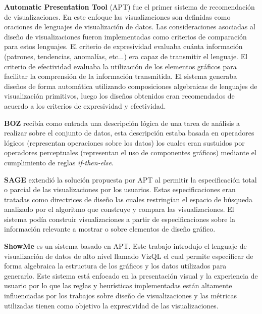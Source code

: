 \textbf{Automatic Presentation Tool} (APT) \cite{mackinlay1986automating} fue el primer sistema de recomendaci\'on de visualizaciones.
En este enfoque las visualizaciones son definidas como oraciones de lenguajes
de visualizaci\'on de datos. Las consideraciones asociadas al dise\~no de visualizaciones
fueron implementadas como criterios de comparaci\'on para estos lenguajes. El criterio de expresividad
evaluaba cu\'anta informaci\'on (patrones, tendencias, anomal\'ias, etc...) era capaz de
transmitir el lenguaje. El criterio de efectividad evaluaba la utilizaci\'on de los
elementos gr\'aficos para facilitar la comprensi\'on de la informaci\'on transmitida.
El sistema generaba dise\~nos de forma autom\'atica utilizando composiciones algebraicas
de lenguajes de visualizaci\'on primitivos, luego los dise\~nos obtenidos eran recomendados de acuerdo
a los criterios de expresividad y efectividad.

\textbf{BOZ} \cite{casner1991task} recib\'ia como entrada una descripci\'on l\'ogica de
una tarea de an\'alisis a realizar sobre el conjunto de datos, esta descripci\'on estaba
basada en operadores l\'ogicos (representan operaciones sobre los datos) los cuales eran
sustuidos por operadores perceptuales (representan el uso de componentes gr\'aficos) mediante
el cumplimiento de reglas \textit{if-then-else}.


\textbf{SAGE} \cite{roth1994interactive} extendi\'o la soluci\'on propuesta por APT al permitir
la especificaci\'on total o parcial de las visualizaciones por los usuarios. Estas especificaciones
eran tratadas como directrices de dise\~no las cuales restring\'ian el espacio de b\'usqueda
analizado por el algoritmo que construye y compara las visualizaciones. El sistema pod\'ia construir
visualizaciones a partir de especificaciones sobre la informaci\'on relevante a mostrar o sobre
elementos de dise\~no gr\'afico.

\textbf{ShowMe} \cite{mackinlay2007show} es un sistema basado en APT. Este
trabajo introdujo el lenguaje de visualizaci\'on de datos de alto nivel llamado VizQL \cite{hanrahan2006vizql} el cual permite
especificar de forma algebraica la estructura de los gr\'aficos y los datos utilizados para generarlo.
Este sistema est\'a enfocado en la presentaci\'on visual y la experiencia de usuario por lo que las reglas y heur\'isticas implementadas
est\'an altamente influenciadas por los trabajos sobre dise\~no de visualizaciones y las m\'etricas utilizadas tienen como objetivo la expresividad de las visualizaciones. 

